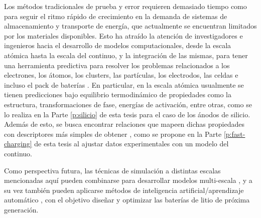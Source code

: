 Los métodos tradicionales de prueba y error requieren demasiado tiempo como 
para seguir el ritmo rápido de crecimiento en la demanda de sistemas de 
almacenamiento y transporte de energía, que actualmente se encuentran limitados por los
materiales disponibles. Esto ha atraído la atención de investigadores e ingenieros 
hacia el desarrollo de modelos computacionales, desde la escala atómica hasta la 
escala del continuo, y la integración de las mismas, para tener una herramienta 
predictiva para resolver los problemas relacionados a los electrones, los átomos, 
los clusters, las partículas, los electrodos, las celdas e incluso el pack de 
baterías \cite{shi2016}. En particular, en la escala atómica usualmente se tienen
predicciones bajo equilibrio termodinámico de propiedades como la estructura, 
transformaciones de fase, energías de activación, entre otras, como se lo realiza
en la Parte \ref{p:silicio} de esta tesis para el caso de los ánodos de silicio. 
Además de esto, se busca encontrar relaciones que mapeen dichas propiedades con 
descriptores más simples de obtener \cite{juan2021}, como se propone en la Parte
\ref{p:fast-charging} de esta tesis al ajustar datos experimentales con un modelo
del continuo.

Como perspectiva futura, las técnicas de simulación a distintas escalas 
mencionadas aquí pueden combinarse para desarrollar modelos multi-escala 
\cite{franco2019}, y a su vez también pueden aplicarse métodos de inteligencia 
artificial/aprendizaje automático \cite{lombardo2021}, con el objetivo diseñar y 
optimizar las baterías de litio de próxima generación. 

